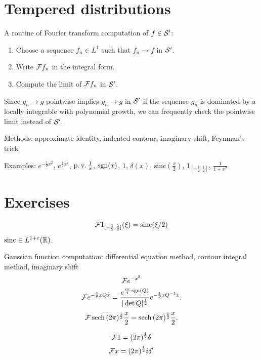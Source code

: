 \documentclass{../../large}
\begin{document}
\section{Tempered distributions}


A routine of Fourier transform computation of $f\in\mathcal{S}'$:
\begin{enumerate}
\item Choose a sequence $f_n\in L^1$ such that $f_n\to f$ in $\mathcal{S}'$.
\item Write $\mathcal{F} f_n$ in the integral form.
\item Compute the limit of $\mathcal{F} f_n$ in $\mathcal{S}'$.
\end{enumerate}
Since $g_n\to g$ pointwise implies $g_n\to g$ in $\mathcal{S}'$ if the sequence $g_n$ is dominated by a locally integrable with polynomial growth, we can frequently check the pointwise limit instead of $\mathcal{S}'$.

Methods: approximate identity, indented contour, imaginary shift, Feynman's trick

Examples: $e^{-\frac12x^2}$, $e^{\frac i2x^2}$, $\operatorname{p.v.}\frac1x$, $\operatorname{sgn}(x)$, $1$, $\delta(x)$, $\mathrm{sinc}(\frac x2)$, $1_{[-\frac12,\frac12]}$, $\frac1{1+x^2}$



\section*{Exercises}
\begin{prb}
\[\mathcal{F}1_{[-\frac12,\frac12]}(\xi)=\operatorname{sinc}(\xi/2)\]
$\operatorname{sinc}\in L^{1+\varepsilon}(\mathbb{R})$.
\end{prb}
\begin{prb}
Gaussian function computation:
differential equation method, contour integral method, imaginary shift
\[\mathcal{F} e^{-x^2}\]
\[\mathcal{F} e^{-\frac12xQx}=\frac{e^{\frac{i\pi}4\operatorname{sgn}(Q)}}{|\det Q|^{\frac12}}e^{-\frac12xQ^{-1}x}.\]
\[\mathcal{F}\operatorname{sech}{(2\pi)^{\frac12}\frac x2}=\operatorname{sech}{(2\pi)^{\frac12}\frac x2}.\]
\end{prb}
\begin{prb}
\[\mathcal{F}1=(2\pi)^{\frac12}\delta\]
\[\mathcal{F} x=(2\pi)^{\frac12}i\delta'\]
\end{prb}
\begin{prb}
\end{prb}
\begin{prb}
\end{prb}
\end{document}
